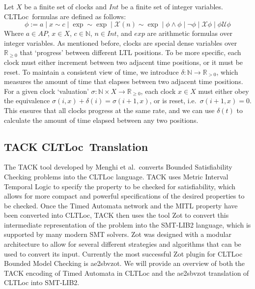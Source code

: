 \documentclass[a4paper,12pt]{article}
\newcommand*\BitOr{\mathbin{|}}
\newcommand{\cltloc}{CLTLoc}
\newcommand{\aez}{ae2sbvzot}
\begin{document}
Let \(X\) be a finite set of clocks and \(Int\) be a finite set of integer
variables. \cltloc\ formulas are defined as follows:
\[\phi := a \BitOr x \sim c \BitOr \exp \sim \exp \BitOr \mathcal{X}(n) \sim \exp \BitOr \phi \land \phi \BitOr \neg \phi \BitOr \mathcal{X}\phi \BitOr \phi \mathcal{U} \phi \]
Where \(a \in AP\), \(x \in X\), \(c \in \mathbb{N}\), \(n \in Int\), and
\(exp\) are arithmetic formulas over integer variables. As mentioned before,
clocks are special dense variables over \(\mathbb{R}_{\geq 0}\) that `progress'
between different LTL positions. To be more specific, each clock must either
increment between two adjacent time positions, or it must be reset. To maintain
a consistent view of time, we introduce
\(\delta: \mathbb{N} \rightarrow \mathbb{R}_{>0}\), which measures the amount of
time that elapses between two adjacent time positions. For a given clock
`valuation' \(\sigma: \mathbb{N} \times X \rightarrow \mathbb{R}_{\geq 0}\),
each clock \(x \in X\) must either obey the equivalence
\(\sigma(i,x) + \delta(i) = \sigma(i+1,x)\), or is reset, i.e.\
\(\sigma(i+1,x) = 0\). This ensures that all clocks progress at the same rate,
and we can use \(\delta(t)\) to calculate the amount of time elapsed between any
two positions.

\subsection{TACK \cltloc\ Translation}\label{prelim-tack}

The TACK\cite{tack20} tool developed by Menghi et al.\ converts Bounded
Satisfiability Checking problems into the CLTLoc language. TACK uses Metric
Interval Temporal Logic to specify the property to be checked for satisfiability,
which allows for more compact and powerful specifications of the desired
properties to be checked. Once the Timed Automata network and the MITL property
have been converted into CLTLoc, TACK then uses the tool Zot to convert this
intermediate representation of the problem into the SMT-LIB2 language, which is
supported by many modern SMT solvers. Zot was designed with a modular
architecture to allow for several different strategies and algorithms that can
be used to convert its input. Currently the most successful Zot plugin for
CLTLoc Bounded Model Checking is \aez. We will provide an overview of both
the TACK encoding of Timed Automata in CLTLoc and the ae2sbvzot translation of
CLTLoc into SMT-LIB2.
\end{document}
